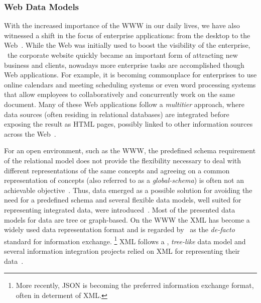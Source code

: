 \subsubsection*{Web Data Models}


With the increased importance of the \ac{WWW} in our daily lives, we have also witnessed a shift in the focus of
enterprise applications: from the desktop to the Web~\cite{AbiteboulBunemanSuciu:1999aa}.
%
While the Web was initially used to boost the visibility of the enterprise, \eg~the corporate website quickly became an
important form of attracting new business and clients, nowadays more enterprise tasks are accomplished though Web
applications.
%
For example, it is becoming commonplace for enterprises to use online calendars and meeting scheduling systems or even
word processing systems that allow employees to collaboratively and concurrently work on the same document.
%
Many of these Web applications follow a \emph{multitier} approach, where data sources (often residing in relational
databases) are integrated before exposing the result as \ac{HTML} pages, possibly linked to other information sources
across the Web~\cite{SilberschatzKorthSudarshan:2005aa,AbiteboulBunemanSuciu:1999aa}.

For an open environment, such as the \ac{WWW}, the predefined schema requirement of the relational model does not
provide the flexibility necessary to deal with different representations of the same concepts and agreeing on a common
representation of concepts (also referred to as a \emph{global-schema}) is often not an achievable
objective~\cite{AbiteboulBunemanSuciu:1999aa}.
%
Thus, \emph{\sd} data emerged as a possible solution for avoiding the need for a predefined schema and several flexible
data models, well suited for representing integrated data, were
introduced~\cite{PapakonstantinouGarcia-MolinaWidom:1995aa,CluetDelobelSimeon:1998aa,Buneman:1997aa}.
%
Most of the presented data models for \sd data are tree or graph-based.
% 
On the \ac{WWW} the \ac{XML} has become a widely used data representation format and is regarded
by~\citet{AbiteboulBunemanSuciu:1999aa} as the \emph{de-facto} standard for information exchange.  \footnote{More
  recently, \ac{JSON} is becoming the preferred information exchange format, often in determent of \ac{XML}.}
%
\ac{XML} follows a \sd, \emph{tree-like} data model and several information integration projects relied on \ac{XML} for
representing their
data~\cite{DraperHalevyWeld:2001ab,DraperHalevyWeld:2001aa,BaruGuptaLudascher:1999aa,ManolescuFlorescuKossmann:2001aa,YuPopa:2004aa}.
%

